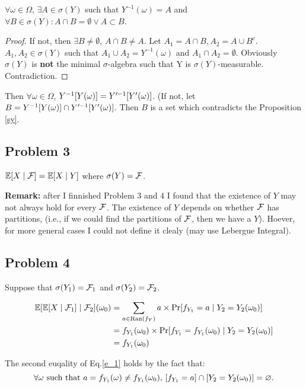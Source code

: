 \documentclass{article}
\begin{document}
\begin{prp}
	\label{sy}
	$\forall\omega\in\Omega$, $\exists A\in\sigma(Y)$ such that $Y^{-1}(\omega)=A$ and $\forall B\in\sigma(Y):A\cap B=\emptyset \lor A\subset B$.
\end{prp}
\begin{proof}
	If not, then $\exists B\ne\emptyset$, $A\cap B\ne A$. Let $A_1=A\cap B,A_2=A\cup B^c$. $A_1,A_2\in\sigma(Y)$ such that $A_1\cup A_2=Y^{-1}(\omega)$ and $A_1\cap A_2=\emptyset$. Obviously $\sigma(Y)$ is \textbf{not} the minimal $\sigma$-algebra such that Y is $\sigma(Y)$-measurable. Contradiction.
\end{proof}

Then $\forall \omega\in\Omega$, $Y^{-1}\qty[Y(\omega)]=Y'^{-1}\qty[Y'(\omega)]$. (If not, let  $B=Y^{-1}\qty[Y(\omega)]\cap Y'^{-1}\qty[Y'(\omega)]$. Then $B$ is a set which contradicts the Proposition \ref{sy}.


\subsection*{\centering Problem 3}

$\mathbb{E}[X\mid\mathcal{F}]=\mathbb{E}[X\mid Y]$ where $\sigma(Y)=\mathcal{F}$.

\textbf{Remark:} after I finnished Problem 3 and 4 I found that the existence of $Y$ may not always hold for every $\mathcal{F}$. The existence of $Y$ depends on whether  $\mathcal{F}$ has partitions, (i.e., if we could find the partitions of $\mathcal{F}$, then we have a  $Y$). Hoever, for more general cases I could not define it clealy (may use Lebergue Integral).
\subsection*{\centering Problem 4}

Suppose that  $\sigma(Y_1)=\mathcal{F}_1$ and $\sigma(Y_2)=\mathcal{F}_2$.

\begin{equation}
	\begin{aligned}
		\mathbb{E}[\mathbb{E}[ X\mid\mathcal{F}_1]\mid\mathcal{F}_2](\omega_0)
		&=\sum_{a\in\text{Ran}(f_Y)}a\times\Pr[f_{Y_1}=a\mid Y_2=Y_2(\omega_0)]
		\\&=
		f_{Y_1}(\omega_0)\times\Pr[f_{Y_1}=f_{Y_1}(\omega_0)\mid Y_2=Y_2(\omega_0)]
		\\&=
		f_{Y_1}(\omega_0)
	\end{aligned}
	\label{e_1}
\end{equation}

The second euqality of Eq.\ref{e_1} holds by the fact that:
\[
	\forall\omega\mbox{ such that }a=f_{Y_1}(\omega)\ne f_{Y_1}(\omega_0)\mbox{, }\qty[f_{Y_1}=a]\cap\qty[Y_2=Y_2(\omega_0)]=\varnothing
.\]
\end{document}
